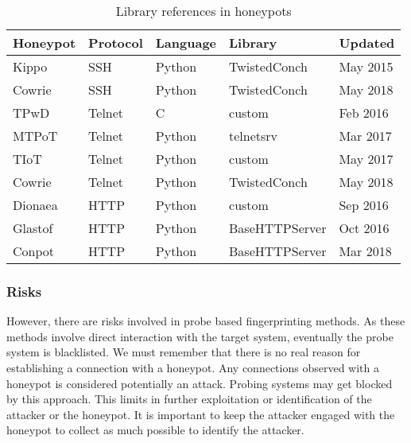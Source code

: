 \documentclass[letterpaper, 10 pt, conference]{ieeeconf}  %
\begin{document}
\begin{table*}[ht!]
\begin{center}
 \begin{tabular}{|l|l|l|l|l|} 
 \hline
 Honeypot & Protocol & Language & Library & Updated \\ [0.3ex] 
 \hline
 Kippo  & SSH    & Python &  TwistedConch & May 2015 \\ 
 Cowrie & SSH    & Python &  TwistedConch & May 2018 \\
 TPwD   & Telnet & C      &  custom       & Feb 2016 \\
 MTPoT  & Telnet & Python &  telnetsrv    & Mar 2017 \\
 TIoT   & Telnet & Python &  custom       & May 2017 \\
 Cowrie & Telnet & Python &  TwistedConch & May 2018 \\
 Dionaea& HTTP   & Python &  custom       & Sep 2016 \\
 Glastof& HTTP   & Python &  BaseHTTPServer& Oct 2016 \\
 Conpot & HTTP   & Python &  BaseHTTPServer& Mar 2018 \\ [1ex] 
 \hline
\end{tabular}
\caption{Library references in honeypots}
\end{center}
\label{table:2}
\end{table*}

\subsubsection{Risks}
However, there are risks involved in probe based fingerprinting methods. As these methods involve direct interaction with the target system, eventually the probe system is blacklisted. We must remember that there is no real reason for establishing a connection with a honeypot. Any connections observed with a honeypot is considered potentially an attack. Probing systems may get blocked by this approach. This limits in further exploitation or identification of the attacker or the honeypot. It is important to keep the attacker engaged with the honeypot to collect as much possible to identify the attacker. 
\end{document}
